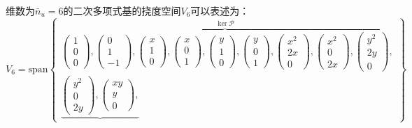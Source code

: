维数为$\bar{n}_u=6$的二次多项式基的挠度空间$V_6$可以表述为：
\begin{equation}\label{ch_5:eq:base2}
    V_6 = \mathrm{span}
    \begin{Bmatrix}
        \overbrace{
        \begin{pmatrix} 1 \\ 0 \\ 0 \end{pmatrix},
        \begin{pmatrix} 0 \\ 1 \\-1 \end{pmatrix},
        \begin{pmatrix} x \\ 1 \\ 0 \end{pmatrix},
        \begin{pmatrix} x \\ 0 \\ 1 \end{pmatrix},
        \begin{pmatrix} y \\ 1 \\ 0 \end{pmatrix},
        \begin{pmatrix} y \\ 0 \\ 1 \end{pmatrix},
        \begin{pmatrix} x^2 \\ 2x \\ 0 \end{pmatrix},
        \begin{pmatrix} x^2 \\ 0 \\ 2x \end{pmatrix},
        \begin{pmatrix} y^2 \\ 2y \\ 0 \end{pmatrix}
        }^{\ker \mathcal P}, \\
        \underbrace{
        \begin{pmatrix} y^2 \\ 0 \\ 2y \end{pmatrix},
        \begin{pmatrix} xy  \\ y \\ 0 \end{pmatrix},
}
\end{Bmatrix}
\end{equation}
